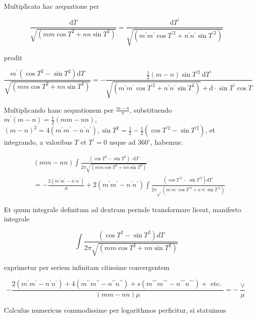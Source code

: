 \documentclass[10pt]{article}
\begin{document}
Multiplicata hac aequatione per

\[
\frac{\mathrm{d} T}{\sqrt{\left(m m \cos T^{2}+n n \sin T^{2}\right)}}=\frac{\mathrm{d} T^{\prime}}{\sqrt{\left(m^{\prime} m^{\prime} \cos T^{\prime 2}+n^{\prime} n^{\prime} \sin T^{\prime 2}\right)}}
\]

prodit

\[
\frac{m^{\prime}\left(\cos T^{2}-\sin T^{2}\right) \mathrm{d} T}{\sqrt{\left(m m \cos T^{2}+n n \sin T^{2}\right)}}=-\frac{\frac{1}{2}(m-n) \sin T^{\prime 2} \mathrm{~d} T^{\prime}}{\sqrt{\left(m^{\prime} m^{\prime} \cos T^{\prime 2}+n^{\prime} n^{\prime} \sin T^{2}\right)}+\mathrm{d} \cdot \sin T^{\prime} \cos T}
\]

Multiplicando hanc aequationem per \(\frac{m-n}{\pi}\), substituendo \(m^{\prime}(m-n)=\frac{1}{2}(m m-n n)\), \((m-n)^{2}=4\left(m^{\prime} m^{\prime}-n^{\prime} n^{\prime}\right), \sin T^{2}=\frac{1}{2}-\frac{1}{2}\left(\cos T^{\prime 2}-\sin T^{\prime 2}\right)\), et integrando, a valoribus \(T\) et \(T^{\prime}=0\) usque ad \(360^{\circ}\), habemus:

\[
\begin{aligned}
& (m m-n n) \int \frac{\left(\cos T^{2}-\sin T^{2}\right) \cdot \mathrm{d} T}{2 \pi \sqrt{\left(m m \cos T^{2}+n n \sin T^{2}\right)}} \\
& =-\frac{2\left(m^{\prime} m^{\prime}-n^{\prime} n^{\prime}\right)}{\mu}+2\left(m^{\prime} m^{\prime}-n^{\prime} n^{\prime}\right) \int \frac{\left(\cos T^{\prime 2}-\sin T^{\prime 2}\right) d T^{\prime}}{2 \pi \sqrt{ }\left(m^{\prime} m^{\prime} \cos T^{\prime 2}+n^{\prime} n^{\prime} \sin T^{\prime 2}\right)}
\end{aligned}
\]

Et quum integrale definitum ad dextram perinde transformare liceat, manifesto integrale

\[
\int \frac{\left(\cos T^{2}-\sin T^{2}\right) d T}{2 \pi \sqrt{\left(m m \cos T^{2}+n n \sin T^{2}\right)}}
\]

exprimetur per seriem infinitam citissime convergentem

\[
-\frac{2\left(m^{\prime} m^{\prime}-n^{\prime} n^{\prime}\right)+4\left(m^{\prime \prime} m^{\prime \prime}-n^{\prime \prime} n^{\prime \prime}\right)+s\left(m^{\prime \prime \prime} m^{\prime \prime \prime}-n^{\prime \prime \prime} n^{\prime \prime \prime}\right)+\text { etc. }}{(m m-n n) \mu}=-\frac{\vee}{\mu}
\]

Calculus numericus commodissime per logarithmos perficitur, si statuimus
\end{document}
